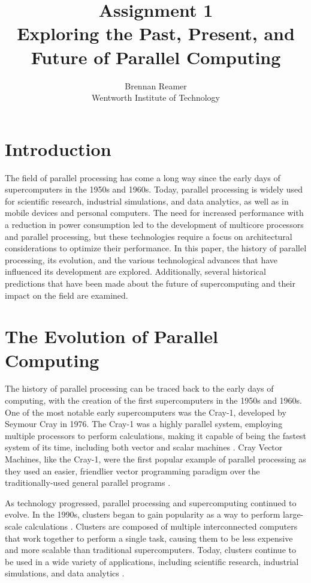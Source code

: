 \documentclass[twocolumn,12pt, singlespace]{IEEEtran}
\title{Assignment 1 \\ {\Large Exploring the Past, Present, and Future of Parallel Computing}}
\author{Brennan Reamer\\ Wentworth Institute of Technology}
\begin{document}
	\maketitle
	\section{Introduction}

	The field of parallel processing has come a long way since the early days of supercomputers in the 1950s and 1960s. Today, parallel processing is widely used for scientific research, industrial simulations, and data analytics, as well as in mobile devices and personal computers. The need for increased performance with a reduction in power consumption led to the development of multicore processors and parallel processing, but these technologies require a focus on architectural considerations to optimize their performance. In this paper, the history of parallel processing, its evolution, and the various technological advances that have influenced its development are explored. Additionally, several historical predictions that have been made about the future of supercomputing and their impact on the field are examined.

	\section{The Evolution of Parallel Computing}
	
	The history of parallel processing can be traced back to the early days of computing, with the creation of the first supercomputers in the 1950s and 1960s.  One of the most notable early supercomputers was the Cray-1, developed by Seymour Cray in 1976. The Cray-1 was a highly parallel system, employing multiple processors to perform calculations, making it capable of being the fastest system of its time, including both vector and scalar machines \cite{Strohmaier:2005}. Cray Vector Machines, like the Cray-1, were the first popular example of parallel processing as they used an easier, friendlier vector programming paradigm over the traditionally-used general parallel programs \cite{Bell:1999}.
	
	As technology progressed, parallel processing and supercomputing continued to evolve. In the 1990s, clusters began to gain popularity as a way to perform large-scale calculations \cite{Bell:2001}. Clusters are composed of multiple interconnected computers that work together to perform a single task, causing them to be less expensive and more scalable than traditional supercomputers\cite{Bell:2001}. Today, clusters continue to be used in a wide variety of applications, including scientific research, industrial simulations, and data analytics  \cite{Strohmaier:2005}.
	
\end{document}

